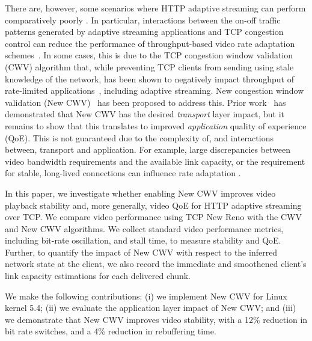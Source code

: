 \documentclass[10pt,sigconf]{acmart}
\begin{document}
There are, however, some scenarios where HTTP adaptive streaming can perform comparatively poorly \cite{Spiteri-2016-BOLA,Kua-2017-a-survey-rate-adaptation-dash}. In particular, interactions between the on-off traffic patterns generated by adaptive streaming applications and TCP congestion control can reduce the performance of throughput-based video rate adaptation schemes~\cite{Akhshabi-2012-http-adaptive-players-compete,Stohr-2017-where-are-the-sweet-spots-maci}. In some cases, this is due to the TCP congestion window validation (CWV) \cite{rfc2861-2000-padhye-congestion-window-validation} algorithm that, while preventing TCP clients from sending using stale knowledge of the network, has been shown to negatively impact throughput of rate-limited applications~\cite{Nazir-2014-performance-evaluation-congestion-window-validation-dash-newcwv}, including adaptive streaming. New congestion window validation (New CWV)~\cite{rfc7661-2015-fairhurst-new-cwnd-validation} has been proposed to address this. Prior work~\cite{Nazir-2014-performance-evaluation-congestion-window-validation-dash-newcwv} has demonstrated that New CWV has the desired \emph{transport} layer impact, but it remains to show that this translates to improved \emph{application} quality of experience (QoE). This is not guaranteed due to the complexity of, and interactions between, transport and application. For example, large discrepancies between video bandwidth requirements and the available link capacity, or the requirement for stable, long-lived connections can influence rate adaptation \cite{Spiteri-2019-from-theory-to-practice-sabre}.

In this paper, we investigate whether enabling New CWV improves video playback stability and, more generally, video QoE for HTTP adaptive streaming over TCP. We compare video performance using TCP New Reno with the CWV and New CWV algorithms. We collect standard video performance metrics, including bit-rate oscillation, and stall time, to measure stability and QoE. Further, to quantify the impact of New CWV with respect to the inferred network state at the client, we also record the immediate and smoothened client's link capacity estimations for each delivered chunk.

We make the following contributions: (i) we implement New CWV for Linux kernel 5.4; (ii) we evaluate the application layer impact of New CWV; and (iii) we demonstrate that New CWV improves video stability, with a 12\% reduction in bit rate switches, and a 4\% reduction in rebuffering time.
\end{document}
